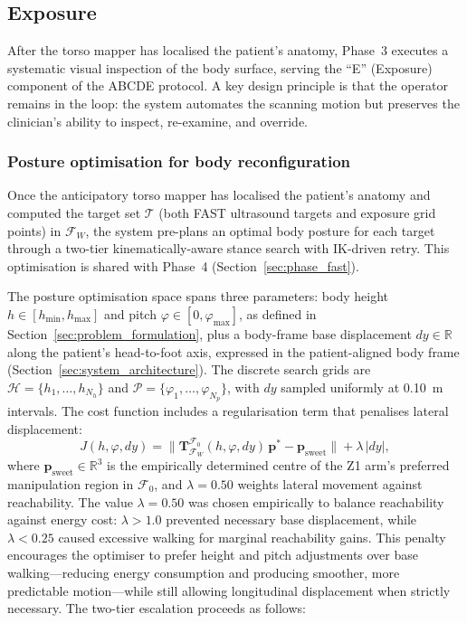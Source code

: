 \subsection{Exposure}
\label{sec:phase_exposure}

After the torso mapper has localised the patient's anatomy, Phase~3
executes a systematic visual inspection of the body surface, serving the ``E''
(Exposure) component of the \ac{ABCDE} protocol. A key design principle is that
the  operator remains in the loop: the system automates the scanning motion but
preserves the clinician's ability to inspect, re-examine, and override.

\subsubsection{Posture optimisation for body reconfiguration}
\label{sec:body_reconf}

Once the anticipatory torso mapper has localised the patient's anatomy and
computed the target set $\mathcal{T}$ (both \ac{FAST} ultrasound targets and
exposure grid points) in $\mathcal{F}_W$, the system pre-plans an optimal body
posture for each target through a two-tier kinematically-aware stance search
with \ac{IK}-driven retry. This optimisation is shared with Phase~4
(Section~\ref{sec:phase_fast}).

The posture optimisation space spans three parameters: body height $h \in
[h_{\min}, h_{\max}]$ and pitch $\varphi \in [0, \varphi_{\max}]$, as defined
in Section~\ref{sec:problem_formulation}, plus a body-frame base displacement
$dy \in \mathbb{R}$ along the patient's head-to-foot axis, expressed in the
patient-aligned body frame (Section~\ref{sec:system_architecture}).
The discrete search grids are $\mathcal{H} = \{h_1, \dots, h_{N_h}\}$ and
$\mathcal{P} = \{\varphi_1, \dots, \varphi_{N_p}\}$, with $dy$ sampled
uniformly at \SI{0.10}{\metre} intervals.  The cost function includes a
regularisation term that penalises lateral displacement:
\begin{equation}
  J(h, \varphi, dy) =
  \bigl\|\mathbf{T}_{\mathcal{F}_W}^{\mathcal{F}_0}(h, \varphi, dy)\,
  \mathbf{p}^* - \mathbf{p}_{\mathrm{sweet}}\bigr\|
  + \lambda\,|dy|,
  \label{eq:posture_cost}
\end{equation}
where $\mathbf{p}_{\mathrm{sweet}} \in \mathbb{R}^3$ is the empirically
determined centre of the Z1 arm's preferred manipulation region in
$\mathcal{F}_0$, and $\lambda = 0.50$ weights lateral movement against
reachability.  The value $\lambda=0.50$ was chosen empirically to balance
reachability against energy cost: $\lambda>1.0$ prevented necessary base
displacement, while $\lambda<0.25$ caused excessive walking for marginal
reachability gains.  This penalty encourages the optimiser to prefer height and pitch
adjustments over base walking---reducing energy consumption and producing
smoother, more predictable motion---while still allowing longitudinal
displacement when strictly necessary.  The two-tier escalation proceeds as
follows:

